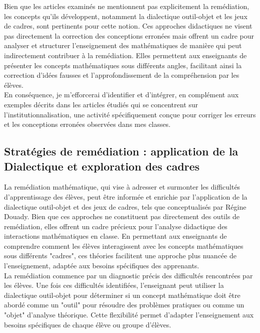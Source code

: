 Bien que les articles examinés ne mentionnent pas explicitement la remédiation,
les concepts qu'ils développent,
notamment la dialectique outil-objet et les jeux de cadres,
sont pertinents pour cette notion.
Ces approches didactiques ne visent pas directement la correction des conceptions erronées mais offrent un cadre pour analyser et structurer l'enseignement des mathématiques de manière qui peut indirectement contribuer à la remédiation.
Elles permettent aux enseignants de présenter les concepts mathématiques sous différents angles,
facilitant ainsi la correction d'idées fausses et l'approfondissement de la compréhension par les élèves.\\

En conséquence,
je m'efforcerai d'identifier et d'intégrer,
en complément aux exemples décrits dans les articles étudiés qui se concentrent sur l'institutionnalisation,
une activité spécifiquement conçue pour corriger les erreurs et les conceptions erronées observées dans mes classes.

\subsection{Stratégies de remédiation : application de la Dialectique et exploration des cadres}

La remédiation mathématique,
qui vise à adresser et surmonter les difficultés d'apprentissage des élèves,
peut être informée et enrichie par l'application de la dialectique outil-objet et des jeux de cadres,
tels que conceptualisés par Régine Douady.
Bien que ces approches ne constituent pas directement des outils de remédiation,
elles offrent un cadre précieux pour l'analyse didactique des interactions mathématiques en classe.
En permettant aux enseignants de comprendre comment les élèves interagissent avec les concepts mathématiques sous différents "cadres",
ces théories facilitent une approche plus nuancée de l'enseignement,
adaptée aux besoins spécifiques des apprenants.\\

La remédiation commence par un diagnostic précis des difficultés rencontrées par les élèves.
Une fois ces difficultés identifiées,
l'enseignant peut utiliser la dialectique outil-objet pour déterminer si un concept mathématique doit être abordé comme un "outil" pour résoudre des problèmes pratiques ou comme un "objet" d'analyse théorique.
Cette flexibilité permet d'adapter l'enseignement aux besoins spécifiques de chaque élève ou groupe d'élèves.\\

